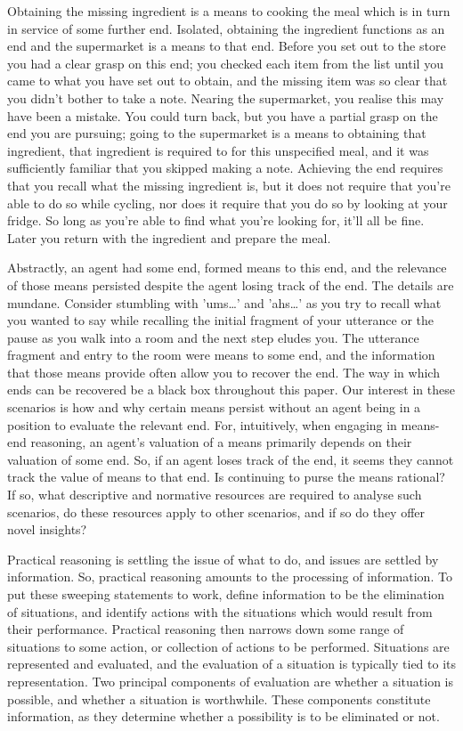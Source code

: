 \documentclass[10pt]{article}
\begin{document}
Obtaining the missing ingredient is a means to cooking the meal which is in turn in service of some further end.
Isolated, obtaining the ingredient functions as an end and the supermarket is a means to that end.
Before you set out to the store you had a clear grasp on this end; you checked each item from the list until you came to what you have set out to obtain, and the missing item was so clear that you didn't bother to take a note.
Nearing the supermarket, you realise this may have been a mistake.
You could turn back, but you have a partial grasp on the end you are pursuing; going to the supermarket is a means to obtaining that ingredient, that ingredient is required to for this unspecified meal, and it was sufficiently familiar that you skipped making a note.
Achieving the end requires that you recall what the missing ingredient is, but it does not require that you're able to do so while cycling, nor does it require that you do so by looking at your fridge.
So long as you're able to find what you're looking for, it'll all be fine.
Later you return with the ingredient and prepare the meal.

Abstractly, an agent had some end, formed means to this end, and the relevance of those means persisted despite the agent losing track of the end.
The details are mundane.
Consider stumbling with 'ums\dots' and 'ahs\dots' as you try to recall what you wanted to say while recalling the initial fragment of your utterance or the pause as you walk into a room and the next step eludes you.
The utterance fragment and entry to the room were means to some end, and the information that those means provide often allow you to recover the end.
The way in which ends can be recovered be a black box throughout this paper.
Our interest in these scenarios is how and why certain means persist without an agent being in a position to evaluate the relevant end.
For, intuitively, when engaging in means-end reasoning, an agent's valuation of a means primarily depends on their valuation of some end.
So, if an agent loses track of the end, it seems they cannot track the value of means to that end.
Is continuing to purse the means rational?
If so, what descriptive and normative resources are required to analyse such scenarios, do these resources apply to other scenarios, and if so do they offer novel insights?

\newpage


Practical reasoning is settling the issue of what to do, and issues are settled by information.
So, practical reasoning amounts to the processing of information.
To put these sweeping statements to work, define information to be the elimination of situations, and identify actions with the situations which would result from their performance.
Practical reasoning then narrows down some range of situations to some action, or collection of actions to be performed.
Situations are represented and evaluated, and the evaluation of a situation is typically tied to its representation.
Two principal components of evaluation are whether a situation is possible, and whether a situation is worthwhile.
These components constitute information, as they determine whether a possibility is to be eliminated or not.
\end{document}
